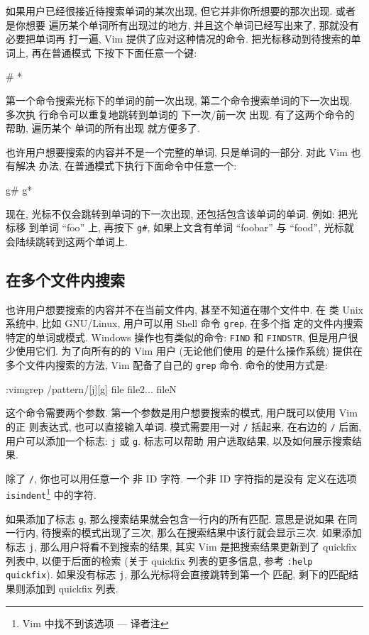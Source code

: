 如果用户已经很接近待搜索单词的某次出现, 但它并非你所想要的那次出现. 或者是你想要
遍历某个单词所有出现过的地方, 并且这个单词已经写出来了, 那就没有必要把单词再
打一遍, Vim 提供了应对这种情况的命令. 把光标移动到待搜索的单词上, 再在普通模式
下按下下面任意一个键:
\begin{vimcode}
#
*
\end{vimcode}
第一个命令搜索光标下的单词的前一次出现, 第二个命令搜索单词的下一次出现. 多次执
行命令可以重复地跳转到单词的 下一次/前一次 出现. 有了这两个命令的帮助, 遍历某个
单词的所有出现 就方便多了.

也许用户想要搜索的内容并不是一个完整的单词, 只是单词的一部分. 对此 Vim 也有解决
办法, 在普通模式下执行下面命令中任意一个:
\begin{vimcode}
g#
g*
\end{vimcode}
现在, 光标不仅会跳转到单词的下一次出现, 还包括包含该单词的单词. 例如: 把光标移
到单词 ``foo'' 上, 再按下 \texttt{g\#}, 如果上文含有单词 ``foobar'' 与 ``food'',
光标就会陆续跳转到这两个单词上.

\subsection{在多个文件内搜索}
\label{subsec:search_in_multiple_files}

也许用户想要搜索的内容并不在当前文件内, 甚至不知道在哪个文件中. 在
类 Unix 系统中, 比如 GNU/Linux, 用户可以用 Shell 命令 \texttt{grep}, 在多个指
定的文件内搜索特定的单词或模式. Windows 操作也有类似的命令: \texttt{FIND} 和
\texttt{FINDSTR}, 但是用户很少使用它们. 为了向所有的的 Vim 用户 (无论他们使用
的是什么操作系统) 提供在多个文件内搜索的方法, Vim 配备了自己的 \texttt{grep}
命令. 命令的使用方式是:
\begin{vimcode}
:vimgrep /pattern/[j][g] file file2... fileN
\end{vimcode}
这个命令需要两个参数. 第一个参数是用户想要搜索的模式, 用户既可以使用 Vim 的正
则表达式, 也可以直接输入单词. 模式需要用一对 \texttt{/} 括起来, 在右边的
\texttt{/} 后面, 用户可以添加一个标志: \texttt{j} 或 \texttt{g}. 标志可以帮助
用户选取结果, 以及如何展示搜索结果.
\begin{warning}
    除了 \texttt{/}, 你也可以用任意一个 非 ID 字符. 一个非 ID 字符指的是没有
    定义在选项 \texttt{isindent}\footnote{Vim 中找不到该选项 --- 译者注}
    中的字符.
\end{warning}

如果添加了标志 \texttt{g}, 那么搜索结果就会包含一行内的所有匹配. 意思是说如果
在同一行内, 待搜索的模式出现了三次, 那么在搜索结果中该行就会显示三次. 如果添加
标志 \texttt{j}, 那么用户将看不到搜索的结果, 其实 Vim 是把搜索结果更新到了
quickfix 列表中, 以便于后面的检索 (关于 quickfix 列表的更多信息, 参考
\texttt{:help quickfix}). 如果没有标志 \texttt{j}, 那么光标将会直接跳转到第一个
匹配, 剩下的匹配结果则添加到 quickfix 列表.

